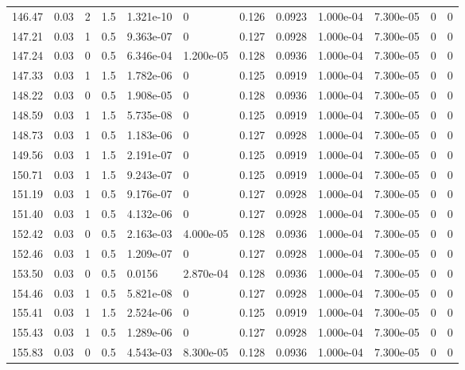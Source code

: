 \documentclass[preview]{standalone}
\begin{document}
{{{{{\begin{tabular}{L{1.2cm}C{1.2cm} C{0.3cm}C{0.5cm} C{1.4cm}C{1.4cm} C{1.4cm}C{1.4cm} C{1.6cm}C{1.6cm} C{1.6cm}C{1.6cm}}
  146.47  &  0.03  & 2     & 1.5 &  1.321e-10  & 0  &  0.126&   0.0923& 1.000e-04 & 7.300e-05   &  0 & 0  \\ 
  147.21  &  0.03  & 1     & 0.5 &  9.363e-07  & 0  &  0.127&   0.0928& 1.000e-04 & 7.300e-05   &  0 & 0  \\ 
  147.24  &  0.03  & 0     & 0.5 &  6.346e-04  & 1.200e-05  &  0.128&   0.0936& 1.000e-04 & 7.300e-05   &  0 & 0  \\ 
  147.33  &  0.03  & 1     & 1.5 &  1.782e-06  & 0  &  0.125&   0.0919& 1.000e-04 & 7.300e-05   &  0 & 0  \\ 
  148.22  &  0.03  & 0     & 0.5 &  1.908e-05  & 0  &  0.128&   0.0936& 1.000e-04 & 7.300e-05   &  0 & 0  \\ 
  148.59  &  0.03  & 1     & 1.5 &  5.735e-08  & 0  &  0.125&   0.0919& 1.000e-04 & 7.300e-05   &  0 & 0  \\ 
  148.73  &  0.03  & 1     & 0.5 &  1.183e-06  & 0  &  0.127&   0.0928& 1.000e-04 & 7.300e-05   &  0 & 0  \\ 
  149.56  &  0.03  & 1     & 1.5 &  2.191e-07  & 0  &  0.125&   0.0919& 1.000e-04 & 7.300e-05   &  0 & 0  \\ 
  150.71  &  0.03  & 1     & 1.5 &  9.243e-07  & 0  &  0.125&   0.0919& 1.000e-04 & 7.300e-05   &  0 & 0  \\ 
  151.19  &  0.03  & 1     & 0.5 &  9.176e-07  & 0  &  0.127&   0.0928& 1.000e-04 & 7.300e-05   &  0 & 0  \\ 
  151.40  &  0.03  & 1     & 0.5 &  4.132e-06  & 0  &  0.127&   0.0928& 1.000e-04 & 7.300e-05   &  0 & 0  \\ 
  152.42  &  0.03  & 0     & 0.5 &  2.163e-03  & 4.000e-05  &  0.128&   0.0936& 1.000e-04 & 7.300e-05   &  0 & 0  \\ 
  152.46  &  0.03  & 1     & 0.5 &  1.209e-07  & 0  &  0.127&   0.0928& 1.000e-04 & 7.300e-05   &  0 & 0  \\ 
  153.50  &  0.03  & 0     & 0.5 &  0.0156  & 2.870e-04  &  0.128&   0.0936& 1.000e-04 & 7.300e-05   &  0 & 0  \\ 
  154.46  &  0.03  & 1     & 0.5 &  5.821e-08  & 0  &  0.127&   0.0928& 1.000e-04 & 7.300e-05   &  0 & 0  \\ 
  155.41  &  0.03  & 1     & 1.5 &  2.524e-06  & 0  &  0.125&   0.0919& 1.000e-04 & 7.300e-05   &  0 & 0  \\ 
  155.43  &  0.03  & 1     & 0.5 &  1.289e-06  & 0  &  0.127&   0.0928& 1.000e-04 & 7.300e-05   &  0 & 0  \\ 
  155.83  &  0.03  & 0     & 0.5 &  4.543e-03  & 8.300e-05  &  0.128&   0.0936& 1.000e-04 & 7.300e-05   &  0 & 0  \\ 

\end{tabular}}}}}}
\end{document}
